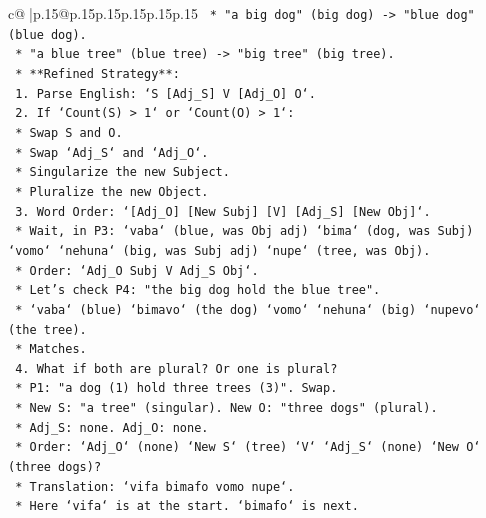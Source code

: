 \documentclass{article}
\begin{document}
{\begin{supertabular}{c@{$\;$}|p{.15\linewidth}@{}p{.15\linewidth}p{.15\linewidth}p{.15\linewidth}p{.15\linewidth}p{.15\linewidth}}
{{{\texttt{                    *   "a big dog" (big dog) {-}> "blue dog" (blue dog).} \\
\texttt{                    *   "a blue tree" (blue tree) {-}> "big tree" (big tree).} \\
\texttt{            *   **Refined Strategy**:} \\
\texttt{                1.  Parse English: `S {[}Adj\_S{]} V {[}Adj\_O{]} O`.} \\
\texttt{                2.  If `Count(S) > 1` or `Count(O) > 1`:} \\
\texttt{                    *   Swap S and O.} \\
\texttt{                    *   Swap `Adj\_S` and `Adj\_O`.} \\
\texttt{                    *   Singularize the new Subject.} \\
\texttt{                    *   Pluralize the new Object.} \\
\texttt{                3.  Word Order: `{[}Adj\_O{]} {[}New Subj{]} {[}V{]} {[}Adj\_S{]} {[}New Obj{]}`.} \\
\texttt{                    *   Wait, in P3: `vaba` (blue, was Obj adj) `bima` (dog, was Subj) `vomo` `nehuna` (big, was Subj adj) `nupe` (tree, was Obj).} \\
\texttt{                    *   Order: `Adj\_O Subj V Adj\_S Obj`.} \\
\texttt{                    *   Let's check P4: "the big dog hold the blue tree".} \\
\texttt{                    *   `vaba` (blue) `bimavo` (the dog) `vomo` `nehuna` (big) `nupevo` (the tree).} \\
\texttt{                    *   Matches.} \\
\texttt{                4.  What if both are plural? Or one is plural?} \\
\texttt{                    *   P1: "a dog (1) hold three trees (3)". Swap.} \\
\texttt{                        *   New S: "a tree" (singular). New O: "three dogs" (plural).} \\
\texttt{                        *   Adj\_S: none. Adj\_O: none.} \\
\texttt{                        *   Order: `Adj\_O` (none) `New S` (tree) `V` `Adj\_S` (none) `New O` (three dogs)?} \\
\texttt{                        *   Translation: `vifa bimafo vomo nupe`.} \\
\texttt{                        *   Here `vifa` is at the start. `bimafo` is next.} \\
}}}
\end{supertabular}}
\end{document}
